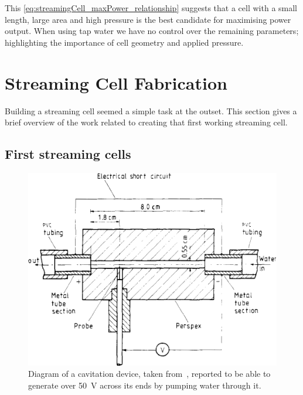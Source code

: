       This \cref{eq:streamingCell_maxPower_relationship} suggests that a cell with a small length, large area and high pressure is the best candidate for maximising power output.
      When using tap water we have no control over the remaining parameters; highlighting the importance of cell geometry and applied pressure.


\section{Streaming Cell Fabrication}
  \label{sect:part1_energyHarvesting_buildingStreamingCells}


  Building a streaming cell seemed a simple task at the outset.
  This section gives a brief overview of the work related to creating that first working streaming cell.


  \subsection{First streaming cells}


    \begin{figure}
      \centering
      \includegraphics{content/pt1/01-PowerHarvesting/graphics/VargaSeymour1986_cell}
      \caption[Diagram of a cavitation device, taken from~\cite{Varga1986}]{\label{fig:first_cell_diagram}Diagram of a cavitation device, taken from~\cite{Varga1986}, reported to be able to generate over \SI{50}{\volt} across its ends by pumping water through it.}
    \end{figure}

